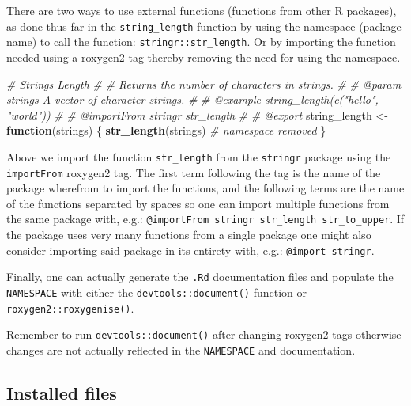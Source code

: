 \documentclass[
  10pt,
]{krantz}
\makeatletter
\newenvironment{Shaded}{\begin{snugshade}}{\end{snugshade}}
\newcommand{\CommentTok}[1]{\textcolor[rgb]{0.37,0.37,0.37}{\textit{#1}}}
\newcommand{\ControlFlowTok}[1]{\textcolor[rgb]{0.27,0.27,0.27}{\textbf{#1}}}
\newcommand{\KeywordTok}[1]{\textcolor[rgb]{0.27,0.27,0.27}{\textbf{#1}}}
\newcommand{\NormalTok}[1]{#1}
\newcommand{\StringTok}[1]{\textcolor[rgb]{0.5,0.5,0.5}{#1}}
\newenvironment{kframe}{%
\medskip{}
\setlength{\fboxsep}{.8em}
 \def\at@end@of@kframe{}%
 \ifinner\ifhmode%
  \def\at@end@of@kframe{\end{minipage}}%
  \begin{minipage}{\columnwidth}%
 \fi\fi%
 \def\FrameCommand##1{\hskip\@totalleftmargin \hskip-\fboxsep
 \colorbox{shadecolor}{##1}\hskip-\fboxsep
     \hskip-\linewidth \hskip-\@totalleftmargin \hskip\columnwidth}%
 \MakeFramed {\advance\hsize-\width
   \@totalleftmargin\z@ \linewidth\hsize
   \@setminipage}}%
 {\par\unskip\endMakeFramed%
 \at@end@of@kframe}
\renewenvironment{Shaded}{\begin{kframe}}{\end{kframe}}
\newenvironment{rmdblock}[1]
  {
  \begin{itemize}
  \renewcommand{\labelitemi}{
    \raisebox{-.7\height}[0pt][0pt]{
      {\setkeys{Gin}{width=3em,keepaspectratio}\texttt{[image: images/\#1]}}
    }
  }
  \setlength{\fboxsep}{1em}
  \begin{kframe}
  \item
  }
  {
  \end{kframe}
  \end{itemize}
  }
\newenvironment{rmdnote}
  {\begin{rmdblock}{note}}
  {\end{rmdblock}}
\makeatother
\begin{document}
There are two ways to use external functions (functions from other R packages), as done thus far in the \texttt{string\_length} function by using the namespace (package name) to call the function: \texttt{stringr::str\_length}. Or by importing the function needed using a roxygen2 tag thereby removing the need for using the namespace.

\begin{Shaded}
\begin{Highlighting}[]
\CommentTok{\#\textquotesingle{} Strings Length}
\CommentTok{\#\textquotesingle{} }
\CommentTok{\#\textquotesingle{} Returns the number of characters in strings. }
\CommentTok{\#\textquotesingle{} }
\CommentTok{\#\textquotesingle{} @param strings A vector of character strings.}
\CommentTok{\#\textquotesingle{} }
\CommentTok{\#\textquotesingle{} @example string\_length(c("hello", "world"))}
\CommentTok{\#\textquotesingle{} }
\CommentTok{\#\textquotesingle{} @importFrom stringr str\_length}
\CommentTok{\#\textquotesingle{} }
\CommentTok{\#\textquotesingle{} @export}
\NormalTok{string\_length <{-}}\StringTok{ }\ControlFlowTok{function}\NormalTok{(strings) \{}
  \KeywordTok{str\_length}\NormalTok{(strings) }\CommentTok{\# namespace removed}
\NormalTok{\}}
\end{Highlighting}
\end{Shaded}

Above we import the function \texttt{str\_length} from the \texttt{stringr} package using the \texttt{importFrom} roxygen2 tag. The first term following the tag is the name of the package wherefrom to import the functions, and the following terms are the name of the functions separated by spaces so one can import multiple functions from the same package with, e.g.: \texttt{@importFrom\ stringr\ str\_length\ str\_to\_upper}. If the package uses very many functions from a single package one might also consider importing said package in its entirety with, e.g.: \texttt{@import\ stringr}.

Finally, one can actually generate the \texttt{.Rd} documentation files and populate the \texttt{NAMESPACE} with either the \texttt{devtools::document()} function or \texttt{roxygen2::roxygenise()}.

\begin{rmdnote}
Remember to run \texttt{devtools::document()} after changing roxygen2
tags otherwise changes are not actually reflected in the
\texttt{NAMESPACE} and documentation.
\end{rmdnote}

\hypertarget{basics-installed-files}{%
\subsection{Installed files}\label{basics-installed-files}}
\end{document}
